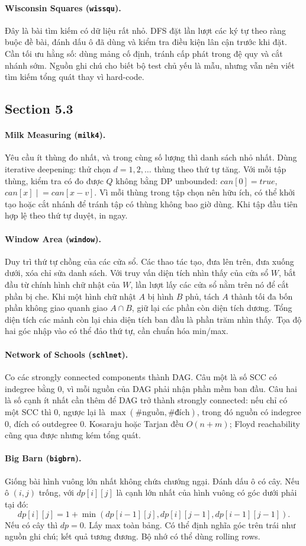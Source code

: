 \documentclass[11pt]{article}
\newcommand{\problem}[2]{\paragraph{#1 (\texttt{#2}).}}
\newcommand{\bigO}[1]{\ensuremath{O(#1)}}
\begin{document}
\problem{Wisconsin Squares}{wissqu}
Đây là bài tìm kiếm có dữ liệu rất nhỏ. DFS đặt lần lượt các ký tự theo ràng buộc đề bài, đánh dấu ô đã dùng và kiểm tra điều kiện lân cận trước khi đặt. Cần tối ưu hằng số: dùng mảng cố định, tránh cấp phát trong đệ quy và cắt nhánh sớm. Nguồn ghi chú cho biết bộ test chủ yếu là mẫu, nhưng vẫn nên viết tìm kiếm tổng quát thay vì hard-code.

\subsection*{Section 5.3}

\problem{Milk Measuring}{milk4}
Yêu cầu ít thùng đo nhất, và trong cùng số lượng thì danh sách nhỏ nhất. Dùng iterative deepening: thử chọn \(d=1,2,\ldots\) thùng theo thứ tự tăng. Với mỗi tập thùng, kiểm tra có đo được \(Q\) không bằng DP unbounded: \(can[0]=true\), \(can[x]\mathrel{|}=can[x-v]\). Vì mỗi thùng trong tập chọn nên hữu ích, có thể khởi tạo hoặc cắt nhánh để tránh tập có thùng không bao giờ dùng. Khi tập đầu tiên hợp lệ theo thứ tự duyệt, in ngay.

\problem{Window Area}{window}
Duy trì thứ tự chồng của các cửa sổ. Các thao tác tạo, đưa lên trên, đưa xuống dưới, xóa chỉ sửa danh sách. Với truy vấn diện tích nhìn thấy của cửa sổ \(W\), bắt đầu từ chính hình chữ nhật của \(W\), lần lượt lấy các cửa sổ nằm trên nó để cắt phần bị che. Khi một hình chữ nhật \(A\) bị hình \(B\) phủ, tách \(A\) thành tối đa bốn phần không giao quanh giao \(A\cap B\), giữ lại các phần còn diện tích dương. Tổng diện tích các mảnh còn lại chia diện tích ban đầu là phần trăm nhìn thấy. Tọa độ hai góc nhập vào có thể đảo thứ tự, cần chuẩn hóa min/max.

\problem{Network of Schools}{schlnet}
Co các strongly connected components thành DAG. Câu một là số SCC có indegree bằng \(0\), vì mỗi nguồn của DAG phải nhận phần mềm ban đầu. Câu hai là số cạnh ít nhất cần thêm để DAG trở thành strongly connected: nếu chỉ có một SCC thì \(0\), ngược lại là \(\max(\#\text{nguồn},\#\text{đích})\), trong đó nguồn có indegree \(0\), đích có outdegree \(0\). Kosaraju hoặc Tarjan đều \(\bigO{n+m}\); Floyd reachability cũng qua được nhưng kém tổng quát.

\problem{Big Barn}{bigbrn}
Giống bài hình vuông lớn nhất không chứa chướng ngại. Đánh dấu ô có cây. Nếu ô \((i,j)\) trống, với \(dp[i][j]\) là cạnh lớn nhất của hình vuông có góc dưới phải tại đó:
\[
  dp[i][j]=1+\min(dp[i-1][j],dp[i][j-1],dp[i-1][j-1]).
\]
Nếu có cây thì \(dp=0\). Lấy max toàn bảng. Có thể định nghĩa góc trên trái như nguồn ghi chú; kết quả tương đương. Bộ nhớ có thể dùng rolling rows.
\end{document}
